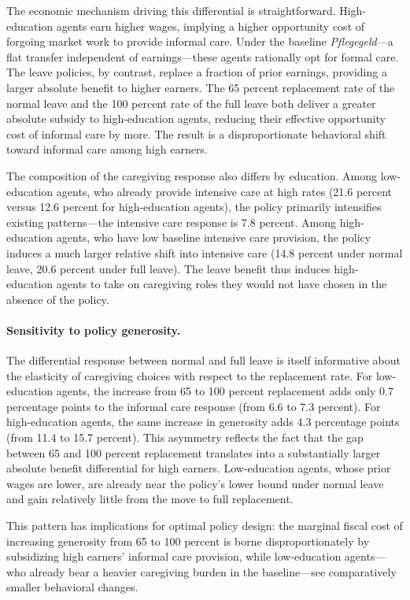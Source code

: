 The economic mechanism driving this differential is straightforward. High-education agents earn higher wages, implying a higher opportunity cost of forgoing market work to provide informal care. Under the baseline \textit{Pflegegeld}---a flat transfer independent of earnings---these agents rationally opt for formal care. The leave policies, by contrast, replace a fraction of prior earnings, providing a larger absolute benefit to higher earners. The 65 percent replacement rate of the normal leave and the 100 percent rate of the full leave both deliver a greater absolute subsidy to high-education agents, reducing their effective opportunity cost of informal care by more. The result is a disproportionate behavioral shift toward informal care among high earners.

The composition of the caregiving response also differs by education. Among low-education agents, who already provide intensive care at high rates (21.6 percent versus 12.6 percent for high-education agents), the policy primarily intensifies existing patterns---the intensive care response is 7.8 percent. Among high-education agents, who have low baseline intensive care provision, the policy induces a much larger relative shift into intensive care (14.8 percent under normal leave, 20.6 percent under full leave). The leave benefit thus induces high-education agents to take on caregiving roles they would not have chosen in the absence of the policy.

\paragraph{Sensitivity to policy generosity.} The differential response between normal and full leave is itself informative about the elasticity of caregiving choices with respect to the replacement rate. For low-education agents, the increase from 65 to 100 percent replacement adds only 0.7 percentage points to the informal care response (from 6.6 to 7.3 percent). For high-education agents, the same increase in generosity adds 4.3 percentage points (from 11.4 to 15.7 percent). This asymmetry reflects the fact that the gap between 65 and 100 percent replacement translates into a substantially larger absolute benefit differential for high earners. Low-education agents, whose prior wages are lower, are already near the policy's lower bound under normal leave and gain relatively little from the move to full replacement.

This pattern has implications for optimal policy design: the marginal fiscal cost of increasing generosity from 65 to 100 percent is borne disproportionately by subsidizing high earners' informal care provision, while low-education agents---who already bear a heavier caregiving burden in the baseline---see comparatively smaller behavioral changes.


